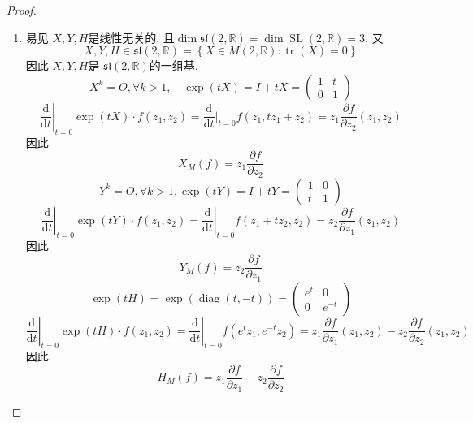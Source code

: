 \documentclass[../main.tex]{subfiles}
\begin{document}
\begin{proof}
\begin{enumerate}
    \item [b).] 易见 \(  X,Y  ,H\)是线性无关的, 且\(  \operatorname{dim}\mathfrak{sl}\left( 2,\mathbb{R}  \right)= \operatorname{dim}\operatorname{SL}\left( 2,\mathbb{R}  \right)= 3    \),  又 \[
    X,Y,H\in \mathfrak{sl}\left( 2,\mathbb{R}  \right)= \left\{ X \in M\left( 2,\mathbb{R}  \right): \operatorname{tr}\left( X \right)= 0   \right\} 
    \]  因此 \(  X,Y,H  \)是 \(  \mathfrak{sl}\left( 2,\mathbb{R}  \right)   \)的一组基.  \[
    X^{k}= O,\forall k> 1,\quad \exp \left( tX \right)= I+ tX= \begin{pmatrix} 
        1&t\\ 
         0&1 
    \end{pmatrix}  
    \]\[
    \left. \frac{\mathrm{d}}{\mathrm{d}t} \right|_{t= 0}\exp \left( tX \right)\cdot f \left( z_1,z_2 \right) =  \frac{\mathrm{d}}{\mathrm{d}t}|_{t= 0}f\left( z_1,tz_1+ z_2 \right)= z_1\frac{\partial f}{\partial z_2}\left( z_1,z_2 \right)  
    \]  因此 \[
    X_{M}\left( f \right)= z_1\frac{\partial f}{\partial z_2} 
    \] \[
    Y^{k}= O,\forall k> 1, \exp \left( tY \right)= I+ tY= \begin{pmatrix} 
        1&0\\ 
         t &1 
    \end{pmatrix}  
    \] \[
    \left. \frac{\mathrm{d}}{\mathrm{d}t} \right|_{t= 0}\exp \left( tY \right)\cdot f\left( z_1,z_2 \right)= \left. \frac{\mathrm{d}}{\mathrm{d}t} \right|_{t= 0}f\left( z_1+ tz_2,z_2 \right)= z_2\frac{\partial f}{\partial z_1}\left( z_1,z_2 \right)    
    \]因此 \[
    Y_{M}\left( f \right)= z_2\frac{\partial f}{\partial z_1} 
    \] \[
    \exp \left( tH \right)= \exp \left( \operatorname{diag} \left( t,-t \right)   \right)= \begin{pmatrix} 
        e^{t}&0\\ 
         0&e^{-t} 
    \end{pmatrix}   
    \] \[
    \left. \frac{\mathrm{d}}{\mathrm{d}t} \right|_{t= 0}\exp \left( tH \right)\cdot f\left( z_1,z_2 \right)= \left. \frac{\mathrm{d}}{\mathrm{d}t} \right|_{t= 0}f\left( e^{t}z_1, e^{-t}z_2 \right)= z_1\frac{\partial f }{\partial z_1}\left(z_1,z_2  \right)-z_2\frac{\partial f}{\partial z_2}\left( z_1,z_2 \right)     
    \]因此 \[
    H_{M}\left( f \right)= z_1\frac{\partial f}{\partial z_1}-z_2\frac{\partial f}{\partial z_2} 
    \]
\end{enumerate}

\end{proof}
\end{document}
